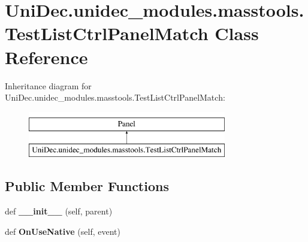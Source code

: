 \hypertarget{class_uni_dec_1_1unidec__modules_1_1masstools_1_1_test_list_ctrl_panel_match}{}\section{Uni\+Dec.\+unidec\+\_\+modules.\+masstools.\+Test\+List\+Ctrl\+Panel\+Match Class Reference}
\label{class_uni_dec_1_1unidec__modules_1_1masstools_1_1_test_list_ctrl_panel_match}
Inheritance diagram for Uni\+Dec.\+unidec\+\_\+modules.\+masstools.\+Test\+List\+Ctrl\+Panel\+Match\+:\begin{figure}[H]
\begin{center}
\leavevmode
\includegraphics[height=2.000000cm]{class_uni_dec_1_1unidec__modules_1_1masstools_1_1_test_list_ctrl_panel_match}
\end{center}
\end{figure}
\subsection*{Public Member Functions}
\begin{DoxyCompactItemize}
\item 
\hypertarget{class_uni_dec_1_1unidec__modules_1_1masstools_1_1_test_list_ctrl_panel_match_ab9387655f34ab0595b9be8a0a4ce2009}{}def {\bfseries \+\_\+\+\_\+init\+\_\+\+\_\+} (self, parent)\label{class_uni_dec_1_1unidec__modules_1_1masstools_1_1_test_list_ctrl_panel_match_ab9387655f34ab0595b9be8a0a4ce2009}

\item 
\hypertarget{class_uni_dec_1_1unidec__modules_1_1masstools_1_1_test_list_ctrl_panel_match_a8704a25384364aacfe9f01783ca8818c}{}def {\bfseries On\+Use\+Native} (self, event)\label{class_uni_dec_1_1unidec__modules_1_1masstools_1_1_test_list_ctrl_panel_match_a8704a25384364aacfe9f01783ca8818c}

\end{DoxyCompactItemize}
